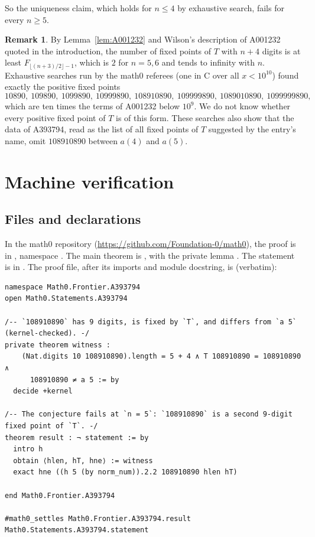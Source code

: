 \documentclass[11pt]{amsart}
\theoremstyle{plain}
\theoremstyle{definition}
\newtheorem{remark}[theorem]{Remark}
\begin{document}
So the uniqueness claim, which holds for $n\le4$ by exhaustive search, fails for every $n\ge5$.

\begin{remark}\label{rem:count}
By Lemma~\ref{lem:A001232} and Wilson's description of A001232 quoted in the introduction, the number of fixed points of $T$ with $n+4$ digits is at least $F_{\lfloor (n+3)/2\rfloor-1}$, which is $2$ for $n=5,6$ and tends to infinity with $n$.
Exhaustive searches run by the math0 referees (one in C over all $x<10^{10}$) found exactly the positive fixed points
\[
  10890,\ 109890,\ 1099890,\ 10999890,\ 108910890,\ 109999890,\ 1089010890,\ 1099999890,
\]
which are ten times the terms of A001232 below $10^9$. We do not know whether every positive fixed point of $T$ is of this form.
These searches also show that the data of A393794, read as the list of all fixed points of $T$ suggested by the entry's name, omit $108910890$ between $a(4)$ and $a(5)$.
\end{remark}

\section{Machine verification}\label{sec:lean}

\subsection*{Files and declarations}
In the math0 repository (\url{https://github.com/Foundation-0/math0}), the proof is in , namespace . The main theorem is , with the private lemma . The statement is  in . The proof file, after its imports and module docstring, is (verbatim):
\begin{lstlisting}
namespace Math0.Frontier.A393794
open Math0.Statements.A393794

/-- `108910890` has 9 digits, is fixed by `T`, and differs from `a 5` (kernel-checked). -/
private theorem witness :
    (Nat.digits 10 108910890).length = 5 + 4 ∧ T 108910890 = 108910890 ∧
      108910890 ≠ a 5 := by
  decide +kernel

/-- The conjecture fails at `n = 5`: `108910890` is a second 9-digit fixed point of `T`. -/
theorem result : ¬ statement := by
  intro h
  obtain ⟨hlen, hT, hne⟩ := witness
  exact hne ((h 5 (by norm_num)).2.2 108910890 hlen hT)

end Math0.Frontier.A393794

#math0_settles Math0.Frontier.A393794.result Math0.Statements.A393794.statement
\end{lstlisting}
\end{document}
